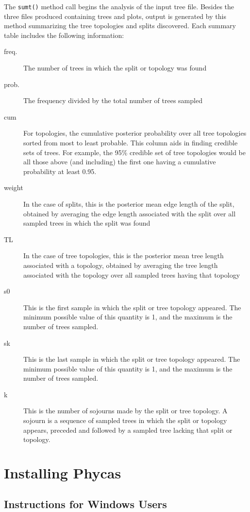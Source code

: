 \documentclass[10pt]{article}
\begin{document}
%
The {\tt sumt()} method call begins the analysis of the input tree file. Besides the three files produced containing trees and plots, output is generated by this method summarizing the tree topologies and splits discovered. Each summary table includes the following information:
\begin{description}
\item[freq.] The number of trees in which the split or topology was found
\item[prob.] The frequency divided by the total number of trees sampled
\item[cum] For topologies, the cumulative posterior probability over all tree topologies sorted from most to least probable. This column aids in finding credible sets of trees. For example, the 95\% credible set of tree topologies would be all those above (and including) the first one having a cumulative probability at least 0.95.
\item[weight] In the case of splits, this is the posterior mean edge length of the split, obtained by averaging the edge length associated with the split over all sampled trees in which the split was found
\item[TL] In the case of tree topologies, this is the posterior mean tree length associated with a topology, obtained by averaging the tree length associated with the topology over all sampled trees having that topology
\item[s0] This is the first sample in which the split or tree topology appeared. The minimum possible value of this quantity is 1, and the maximum is the number of trees sampled.
\item[sk] This is the last sample in which the split or tree topology appeared. The minimum possible value of this quantity is 1, and the maximum is the number of trees sampled.
\item[k] This is the number of sojourns made by the split or tree topology. A sojourn is a sequence of sampled trees in which the split or topology appears, preceded and followed by a sampled tree lacking that split or topology.
\end{description}

\section{Installing Phycas}\label{sec:install}
\subsection{Instructions for Windows Users} 
\end{document}
